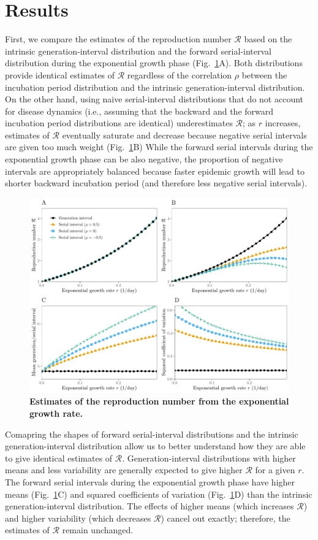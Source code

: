 \documentclass[12pt]{article}
\newcommand{\fref}[1]{Fig.~\ref{fig:#1}}
\begin{document}
\section{Results}

First, we compare the estimates of the reproduction number $\mathcal R$ based on the intrinsic generation-interval distribution and the forward serial-interval distribution during the exponential growth phase (\fref{rR}A).
Both distributions provide identical estimates of $\mathcal R$ regardless of the correlation $\rho$ between the incubation period distribution and the intrinsic generation-interval distribution.
On the other hand, using naive serial-interval distributions that do not account for disease dynamics (i.e., assuming that the backward and the forward incubation period distributions are identical) underestimates $\mathcal R$;
as $r$ increases, estimates of $\mathcal R$ eventually saturate and decrease because negative serial intervals are given too much weight (\fref{rR}B)
While the forward serial intervals during the exponential growth phase can be also negative, the proportion of negative intervals are appropriately balanced because faster epidemic growth will lead to shorter backward incubation period (and therefore less negative serial intervals).

\begin{figure}[!ht]
\includegraphics[width=\textwidth]{rR.pdf}
\caption{
\textbf{Estimates of the reproduction number from the exponential growth rate.}
}
\label{fig:rR}
\end{figure}

Comapring the shapes of forward serial-interval distributions and the intrinsic generation-interval distribution allow us to better understand how they are able to give identical estimates of $\mathcal R$.
Generation-interval distributions with higher means and less variability are generally expected to give higher $\mathcal R$ for a given $r$.
The forward serial intervals during the exponential growth phase have higher means (\fref{rR}C) and squared coefficients of variation (\fref{rR}D) than the intrinsic generation-interval distribution.
The effects of higher means (which increases $\mathcal R$) and higher variability (which decreases $\mathcal R$) cancel out exactly;
therefore, the estimates of $\mathcal R$ remain unchanged.
\end{document}
